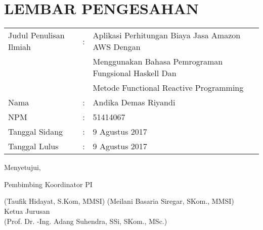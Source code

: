 \documentclass[pi.tex]{subfile}
\begin{document}
\chapter*{LEMBAR PENGESAHAN}

\begin{tabular}{lcl}
  Judul Penulisan Ilmiah &:& Aplikasi Perhitungan Biaya Jasa Amazon AWS Dengan \\ & & Menggunakan Bahasa Pemrograman Fungsional Haskell Dan \\ & & Metode Functional Reactive Programming \\
  Nama &:& Andika Demas Riyandi \\
  NPM &:& 51414067 \\
  Tanggal Sidang &:& 9 Agustus 2017 \\
  Tanggal Lulus &:& 9 Agustus 2017 \\
\end{tabular}\vspace*{2\baselineskip}


\hspace*{\fill}
        Menyetujui,
\hspace*{\fill}


\vspace{0.5cm}
\hspace{1.5cm}	Pembimbing \hspace{4.5cm}	Koordinator PI


\vspace{2cm}
(Taufik Hidayat, S.Kom, MMSI) \hspace{0.5cm}	(Meilani Basaria Siregar, SKom., MMSI) \\

\vspace{1cm}
\hspace*{\fill}
        Ketua Jurusan
\hspace*{\fill}\\

\vspace{2cm}
        \hspace*{\fill}
        (Prof. Dr. -Ing. Adang Suhendra, SSi, SKom., MSc.)
\hspace*{\fill}
\end{document}
